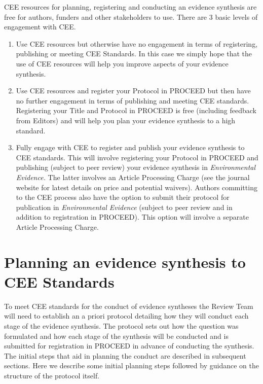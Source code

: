 \documentclass[
  letterpaper,
  DIV=11,
  numbers=noendperiod]{scrreprt}
\begin{document}
CEE resources for planning, registering and conducting an evidence
synthesis are free for authors, funders and other stakeholders to use.
There are 3 basic levels of engagement with CEE.

\begin{enumerate}
\def\labelenumi{\arabic{enumi}.}
\item
  Use CEE resources but otherwise have no engagement in terms of
  registering, publishing or meeting CEE Standards. In this case we
  simply hope that the use of CEE resources will help you improve
  aspects of your evidence synthesis.
\item
  Use CEE resources and register your Protocol in PROCEED but then have
  no further engagement in terms of publishing and meeting CEE
  standards. Registering your Title and Protocol in PROCEED is free
  (including feedback from Editors) and will help you plan your evidence
  synthesis to a high standard.
\item
  Fully engage with CEE to register and publish your evidence synthesis
  to CEE standards. This will involve registering your Protocol in
  PROCEED and publishing (subject to peer review) your evidence
  synthesis in \emph{Environmental Evidence.} The latter involves an
  Article Processing Charge (see the journal website for latest details
  on price and potential waivers). Authors committing to the CEE process
  also have the option to submit their protocol for publication in
  \emph{Environmental Evidence} (subject to peer review and in addition
  to registration in PROCEED). This option will involve a separate
  Article Processing Charge.
\end{enumerate}

\section{\texorpdfstring{\textbf{Planning an evidence synthesis to CEE
Standards}}{Planning an evidence synthesis to CEE Standards}}\label{planning-an-evidence-synthesis-to-cee-standards}

To meet CEE standards for the conduct of evidence syntheses the Review
Team will need to establish an a priori protocol detailing how they will
conduct each stage of the evidence synthesis. The protocol sets out how
the question was formulated and how each stage of the synthesis will be
conducted and is submitted for registration in PROCEED in advance of
conducting the synthesis. The initial steps that aid in planning the
conduct are described in subsequent sections. Here we describe some
initial planning steps followed by guidance on the structure of the
protocol itself.
\end{document}
